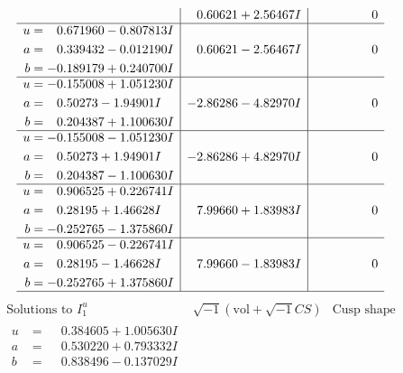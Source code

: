 \documentclass[1p]{elsarticle_modified}
\theoremstyle{definition}
\newcommand{\I}{\sqrt{-1}}
\begin{document}
$$\begin{array}{c|c|c}
 & \phantom{-}0.60621 + 2.56467 I & \phantom{-0.000000 } 0 \\ \hline\begin{aligned}
u &= \phantom{-}0.671960 - 0.807813 I \\
a &= \phantom{-}0.339432 - 0.012190 I \\
b &= -0.189179 + 0.240700 I\end{aligned}
 & \phantom{-}0.60621 - 2.56467 I & \phantom{-0.000000 } 0 \\ \hline\begin{aligned}
u &= -0.155008 + 1.051230 I \\
a &= \phantom{-}0.50273 - 1.94901 I \\
b &= \phantom{-}0.204387 + 1.100630 I\end{aligned}
 & -2.86286 - 4.82970 I & \phantom{-0.000000 } 0 \\ \hline\begin{aligned}
u &= -0.155008 - 1.051230 I \\
a &= \phantom{-}0.50273 + 1.94901 I \\
b &= \phantom{-}0.204387 - 1.100630 I\end{aligned}
 & -2.86286 + 4.82970 I & \phantom{-0.000000 } 0 \\ \hline\begin{aligned}
u &= \phantom{-}0.906525 + 0.226741 I \\
a &= \phantom{-}0.28195 + 1.46628 I \\
b &= -0.252765 - 1.375860 I\end{aligned}
 & \phantom{-}7.99660 + 1.83983 I & \phantom{-0.000000 } 0 \\ \hline\begin{aligned}
u &= \phantom{-}0.906525 - 0.226741 I \\
a &= \phantom{-}0.28195 - 1.46628 I \\
b &= -0.252765 + 1.375860 I\end{aligned}
 & \phantom{-}7.99660 - 1.83983 I & \phantom{-0.000000 } 0\\
 \hline 
 \end{array}$$\newpage$$\begin{array}{c|c|c}  
\text{Solutions to }I^u_{1}& \I (\text{vol} + \sqrt{-1}CS) & \text{Cusp shape}\\
 \hline 
\begin{aligned}
u &= \phantom{-}0.384605 + 1.005630 I \\
a &= \phantom{-}0.530220 + 0.793332 I \\
b &= \phantom{-}0.838496 - 0.137029 I\end{aligned}

\end{array}$$
\end{document}
